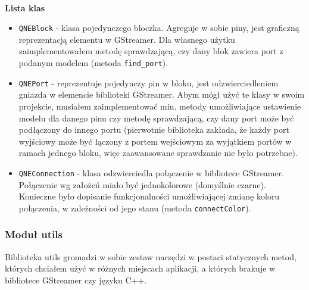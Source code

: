 \documentclass[12pt]{article}
\begin{document}
\paragraph{}
\textbf{Lista klas}
\vspace{-2mm}
\begin{itemize}
 \setlength{\itemsep}{0em}
\item \texttt{QNEBlock} - klasa pojedynczego bloczka. Agreguje w sobie piny, jest graficzną reprezentacją elementu w GStreamer. Dla własnego użytku zaimplementowałem metodę sprawdzającą, czy dany blok zawiera port z podanym modelem (metoda \texttt{find\_port}).
\item \texttt{QNEPort} - reprezentuje pojedynczy pin w bloku, jest odzwierciedleniem gniazda w elemencie biblioteki GStreamer. Abym mógł użyć te klasy w swoim projekcie, musiałem zaimplementować min. metody umożliwiające ustawienie modelu dla danego pinu czy metodę sprawdzającą, czy dany port może być podłączony do innego portu (pierwotnie biblioteka zakłada, że każdy port wyjściowy może być łączony z portem wejściowym za wyjątkiem portów w ramach jednego bloku, więc zaawansowane sprawdzanie nie było potrzebne).
\item \texttt{QNEConnection} - klasa odzwierciedla połączenie w bibliotece GStreamer. Połączenie wg założeń miało być jednokolorowe (domyślnie czarne). Konieczne było dopisanie funkcjonalności umożliwiającej zmianę koloru połączenia, w zależności od jego stanu (metoda \texttt{connectColor}).
\end{itemize}
\subsubsection{Moduł utils}
Biblioteka utils gromadzi w sobie zestaw narzędzi w postaci statycznych metod, których chciałem użyć w różnych miejscach aplikacji, a których brakuje w bibliotece GStreamer czy języku C++.
\end{document}
